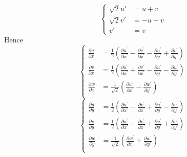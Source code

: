\documentclass[12pt,a4]{ctexart}
\begin{document}
\begin{equation}
   \begin{cases}
      \sqrt{2} u' & = u + v  \\
      \sqrt{2} v' & = -u + v \\
      v'          & = v
   \end{cases}
\end{equation}
Hence
\begin{equation}
   \begin{cases}
      \frac{\partial u}{\partial x} & =\frac{1}{2}\left(\frac{\partial u^{\prime}}{\partial x^{\prime}}-\frac{\partial v^{\prime}}{\partial x^{\prime}}-\frac{\partial u^{\prime}}{\partial y^{\prime}}+\frac{\partial v^{\prime}}{\partial y^{\prime}}\right) \\
      \frac{\partial v}{\partial x} & =\frac{1}{2}\left(\frac{\partial u^{\prime}}{\partial x^{\prime}}+\frac{\partial v^{\prime}}{\partial x^{\prime}}-\frac{\partial u^{\prime}}{\partial y^{\prime}}-\frac{\partial u^{\prime}}{\partial y^{\prime}}\right) \\
      \frac{\partial w}{\partial x} & =\frac{1}{\sqrt{2}}\left(\frac{\partial w^{\prime}}{\partial x^{\prime}}-\frac{\partial w^{\prime}}{\partial y^{\prime}}\right)                                                                                          \\
   \end{cases}
\end{equation}
\begin{equation}
   \begin{cases}
      \frac{\partial u}{\partial y} & =\frac{1}{2}\left(\frac{\partial u^{\prime}}{\partial x^{\prime}}-\frac{\partial v^{\prime}}{\partial x^{\prime}}+\frac{\partial u^{\prime}}{\partial y^{\prime}}-\frac{\partial v^{\prime}}{\partial y^{\prime}}\right) \\
      \frac{\partial v}{\partial y} & =\frac{1}{2}\left(\frac{\partial u^{\prime}}{\partial x^{\prime}}+\frac{\partial v^{\prime}}{\partial x^{\prime}}+\frac{\partial u^{\prime}}{\partial y^{\prime}}+\frac{\partial v^{\prime}}{\partial y^{\prime}}\right) \\
      \frac{\partial w}{\partial y} & =\frac{1}{\sqrt{2}}\left(\frac{\partial w^{\prime}}{\partial x^{\prime}}+\frac{\partial w^{\prime}}{\partial y^{\prime}}\right)                                                                                          \\
   \end{cases}
\end{equation}
\end{document}
